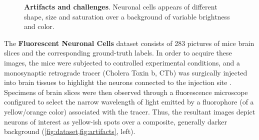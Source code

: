 \begin{figure}
\begin{subfigure}{1.1\textwidth}
\label{fig:artifacts:macaroon}
\end{subfigure}
\vspace{-0.2cm}
\caption{
\textbf{Artifacts and challenges}. Neuronal cells appears of different shape, size and saturation over a background of variable brightness and color.
} 
\label{fig:artifacts}
\end{figure}

The \textbf{Fluorescent Neuronal Cells} dataset \cite{clissa2021fluocells} consists of 283 
pictures 
of mice brain slices and the corresponding ground-truth labels.
In order to acquire these images, the mice were subjected to controlled experimental conditions, and a monosynaptic retrograde tracer (Cholera Toxin b, CTb) was surgically injected into brain tissues to highlight the neurons connected to the injection site
\cite{hitrec2019neural}.
Specimens of brain slices were then observed through  
a fluorescence microscope configured to select the narrow wavelength of light emitted by 
a fluorophore (of a yellow/orange color) associated with the tracer.
Thus, the resultant images depict neurons of interest as
yellow-ish spots
over a composite, generally darker background (\cref{fig:dataset,fig:artifacts}, left).

